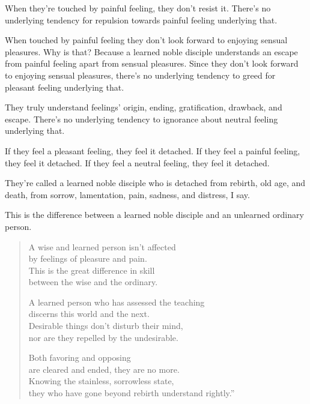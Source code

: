 \documentclass[12pt,openany]{book}%
\begin{document}
When they’re touched by painful feeling, they don’t resist it. There’s no underlying tendency for repulsion towards painful feeling underlying that. 

When touched by painful feeling they don’t look forward to enjoying sensual pleasures. Why is that? Because a learned noble disciple understands an escape from painful feeling apart from sensual pleasures. Since they don’t look forward to enjoying sensual pleasures, there’s no underlying tendency to greed for pleasant feeling underlying that. 

They truly understand feelings’ origin, ending, gratification, drawback, and escape. There’s no underlying tendency to ignorance about neutral feeling underlying that. 

If they feel a pleasant feeling, they feel it detached. If they feel a painful feeling, they feel it detached. If they feel a neutral feeling, they feel it detached. 

They’re called a learned noble disciple who is detached from rebirth, old age, and death, from sorrow, lamentation, pain, sadness, and distress, I say. 

This is the difference between a learned noble disciple and an unlearned ordinary person. 

\begin{verse}%
A wise and learned person isn’t affected \\
by feelings of pleasure and pain. \\
This is the great difference in skill \\
between the wise and the ordinary. 

A learned person who has assessed the teaching \\
discerns this world and the next. \\
Desirable things don’t disturb their mind, \\
nor are they repelled by the undesirable. 

Both favoring and opposing \\
are cleared and ended, they are no more. \\
Knowing the stainless, sorrowless state, \\
they who have gone beyond rebirth understand rightly.” 

%
\end{verse}
\end{document}
